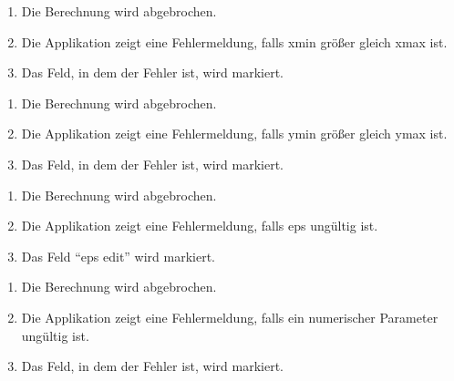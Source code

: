 \begin{itemize}
	 \begin{enumerate}[label=(2a\arabic*)]    
	 	\item Die Berechnung wird abgebrochen.
		\item Die Applikation zeigt eine Fehlermeldung, falls xmin gr\"o\ss er gleich xmax ist.
		\item Das Feld, in dem der Fehler ist, wird markiert.
	\end{enumerate}
	 \begin{enumerate}[label=(3a\arabic*)]    
	 	\item Die Berechnung wird abgebrochen.
		\item Die Applikation zeigt eine Fehlermeldung, falls ymin gr\"o\ss er gleich ymax ist.\\
		\item Das Feld, in dem der Fehler ist, wird markiert.
	\end{enumerate}
		 \begin{enumerate}[label=(4a\arabic*)]    
		 	\item Die Berechnung wird abgebrochen.
		 \item Die Applikation zeigt eine Fehlermeldung, falls eps ung\"ultig ist.
		 \item Das Feld "`eps edit"' wird markiert.
		 \end{enumerate}
	 \begin{enumerate}[label=(5a\arabic*)]    
	 	\item Die Berechnung wird abgebrochen.
		\item Die Applikation zeigt eine Fehlermeldung, falls ein numerischer Parameter ung\"ultig ist.
		\item Das Feld, in dem der Fehler ist, wird markiert.
    \end{enumerate}
  \end{itemize}